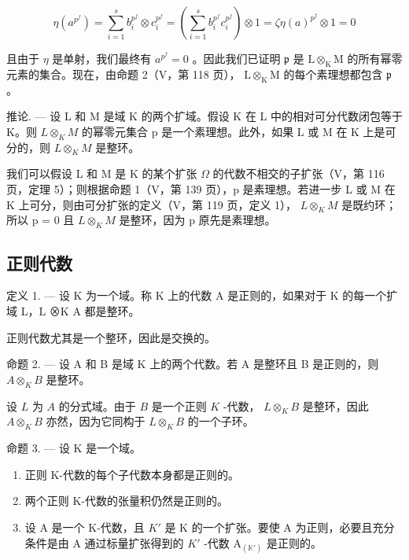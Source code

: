 \[
\eta \left(a ^ {p ^ {f}}\right) = \sum_ {i = 1} ^ {s} b _ {i} ^ {p ^ {f}} \otimes c _ {i} ^ {p ^ {f}} = \left(\sum_ {i = 1} ^ {s} b _ {i} ^ {p ^ {f}} c _ {i} ^ {p ^ {f}}\right) \otimes 1 = \zeta \eta (a) ^ {p ^ {f}} \otimes 1 = 0
\]

且由于 \(\eta\) 是单射，我们最终有 \(a^{p^{f}} = 0\) 。因此我们已证明 \(\mathfrak{p}\) 是 \(\mathrm{L} \otimes_{\mathrm{K}} \mathrm{M}\) 的所有幂零元素的集合。现在，由命题 2（V，第 118 页）， \(\mathrm{L} \otimes_{\mathrm{K}} \mathrm{M}\) 的每个素理想都包含 \(\mathfrak{p}\) 。

推论. --- 设 L 和 M 是域 K 的两个扩域。假设 K 在 L 中的相对可分代数闭包等于 K。则 \(L \otimes_{K} M\) 的幂零元集合 p 是一个素理想。此外，如果 L 或 M 在 K 上是可分的，则 \(L \otimes_{K} M\) 是整环。

我们可以假设 L 和 M 是 K 的某个扩张 \(\Omega\) 的代数不相交的子扩张（V，第 116 页，定理 5）；则根据命题 1（V，第 139 页），p 是素理想。若进一步 L 或 M 在 K 上可分，则由可分扩张的定义（V，第 119 页，定义 1）， \(L \otimes_{K} M\) 是既约环；所以 p = 0 且 \(L \otimes_{K} M\) 是整环，因为 p 原先是素理想。

\subsection{正则代数}

定义 1. --- 设 K 为一个域。称 K 上的代数 A 是正则的，如果对于 K 的每一个扩域 L，L ⊗K A 都是整环。

正则代数尤其是一个整环，因此是交换的。

命题 2. --- 设 A 和 B 是域 K 上的两个代数。若 A 是整环且 B 是正则的，则 \(A \otimes_{K} B\) 是整环。

设 \(L\) 为 \(A\) 的分式域。由于 \(B\) 是一个正则 \(K\) -代数， \(L \otimes_K B\) 是整环，因此 \(A \otimes_K B\) 亦然，因为它同构于 \(L \otimes_K B\) 的一个子环。

命题 3. --- 设 K 是一个域。

\begin{enumerate}
\def\labelenumi{\alph{enumi})}
\item
  正则 K-代数的每个子代数本身都是正则的。
\item
  两个正则 K-代数的张量积仍然是正则的。
\item
  设 A 是一个 K-代数，且 \(K'\) 是 K 的一个扩张。要使 A 为正则，必要且充分条件是由 A 通过标量扩张得到的 \(K'\) -代数 \(\mathrm{A}_{(\mathbb{K}')}\) 是正则的。
\end{enumerate}

